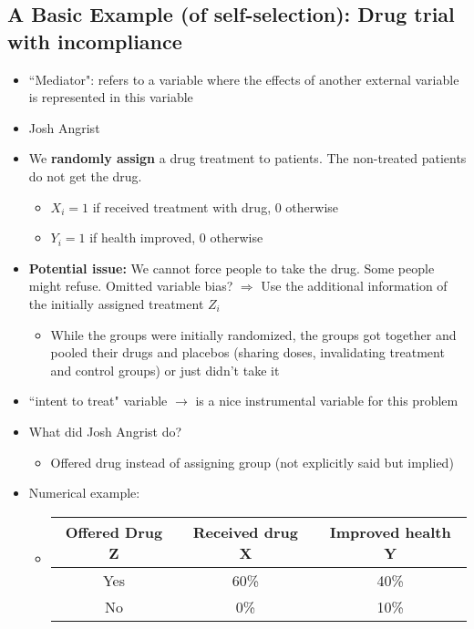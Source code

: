 \documentclass[10pt, oneside]{article}
\begin{document}
\subsection{A Basic Example (of self-selection): Drug trial with incompliance}
\begin{itemize}
    \item ``Mediator": refers to a variable where the effects of another external variable is represented in this variable
    \item Josh Angrist
    \item We \textbf{randomly assign} a drug treatment to patients. The non-treated patients do not get the drug.
    \begin{itemize}
        \item $X_i = 1$ if received treatment with drug, 0 otherwise
        \item $Y_i = 1$ if health improved, 0 otherwise
    \end{itemize}
    \item \textbf{Potential issue:} We cannot force people to take the drug. Some people might refuse. Omitted variable bias? $\Rightarrow$ Use the additional information of the initially assigned treatment $Z_i$
    \begin{itemize}
        \item While the groups were initially randomized, the groups got together and pooled their drugs and placebos (sharing doses, invalidating treatment and control groups) or just didn't take it
    \end{itemize}
    \item ``intent to treat" variable $\rightarrow$ is a nice instrumental variable for this problem
    \item What did Josh Angrist do?
    \begin{itemize}
        \item Offered drug instead of assigning group (not explicitly said but implied)
    \end{itemize}
    \item Numerical example:
    \begin{itemize}
        \item \begin{tabular}{|c|c|c|}
            \hline
            Offered Drug Z & Received drug X & Improved health Y \\
            \hline
            Yes&60\%&40\%\\
            No & 0\% & 10\% \\

\end{tabular}
\end{itemize}
\end{itemize}
\end{document}
